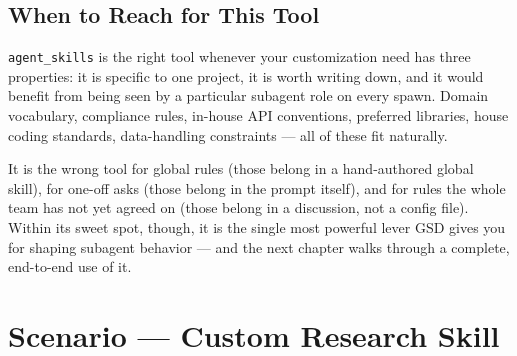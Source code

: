 \documentclass[11pt,letterpaper,openany]{book}
\begin{document}
\section{When to Reach for This Tool}

\texttt{agent\_skills} is the right tool whenever your customization
need has three properties: it is specific to one project, it is worth
writing down, and it would benefit from being seen by a particular
subagent role on every spawn. Domain vocabulary, compliance rules,
in-house API conventions, preferred libraries, house coding standards,
data-handling constraints --- all of these fit naturally.

It is the wrong tool for global rules (those belong in a hand-authored
global skill), for one-off asks (those belong in the prompt itself),
and for rules the whole team has not yet agreed on (those belong in a
discussion, not a config file). Within its sweet spot, though, it is
the single most powerful lever GSD gives you for shaping subagent
behavior --- and the next chapter walks through a complete,
end-to-end use of it.

\chapter{Scenario --- Custom Research Skill}
\end{document}
